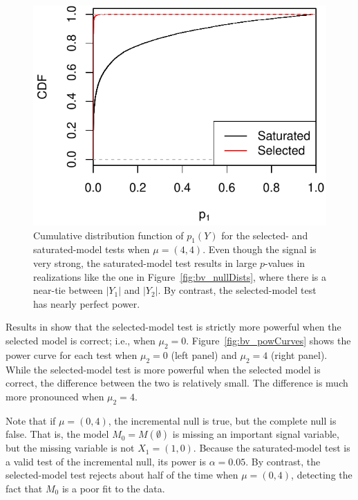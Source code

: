 \documentclass{article}
\begin{document}
\begin{figure}
  \centering
  \includegraphics[width=.5\textwidth]{figs/bivariateSelVSat_rocCurve.pdf}
  \caption{Cumulative distribution function of $p_1(Y)$ for the selected- and saturated-model tests when $\mu=(4,4)$. Even though the signal is very strong, the saturated-model test results in large $p$-values in realizations like the one in Figure~\ref{fig:bv_nullDists}, where there is a near-tie between $|Y_1|$ and $|Y_2|$. By contrast, the selected-model test has nearly perfect power.}
  \label{fig:bv_rocCurve}
\end{figure}

Results in \citet{fithian2014optimal} show that the selected-model test is strictly more powerful when the selected model is correct; i.e., when $\mu_2=0$. Figure~\ref{fig:bv_powCurves} shows the power curve for each test when $\mu_2=0$ (left panel) and $\mu_2=4$ (right panel). While the selected-model test is more powerful when the selected model is correct, the difference between the two is relatively small. The difference is much more pronounced when $\mu_2=4$.

Note that if $\mu=(0,4)$, the incremental null is true, but the complete null is false. That is, the model $M_0 = M(\emptyset)$ is missing an important signal variable, but the missing variable is not $X_1 = (1,0)$. Because the saturated-model test is a valid test of the incremental null, its power is $\alpha=0.05$. By contrast, the selected-model test rejects about half of the time when $\mu=(0,4)$, detecting the fact that $M_0$ is a poor fit to the data.
\end{document}
